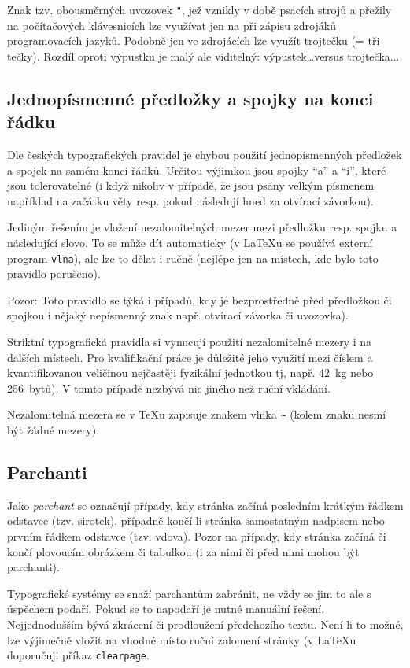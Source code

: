 Znak tzv. obousměrných uvozovek \verb!"!, jež vznikly v době psacích strojů a přežily na počítačových klávesnicích lze využívat jen na při zápisu zdrojáků programovacích jazyků. Podobně jen ve zdrojácích lze využít trojtečku (= tři tečky). Rozdíl oproti výpustku je malý ale viditelný: 
výpustek\ldots versus trojtečka...


\subsection{Jednopísmenné předložky a spojky na konci řádku}

Dle českých typografických pravidel je chybou použití jednopísmenných předložek a spojek na samém konci řádků. 
Určitou výjimkou jsou spojky \enquote{a} a \enquote{i}, které jsou tolerovatelné (i když nikoliv v případě, že jsou psány velkým písmenem například na začátku věty resp. pokud následují hned za otvírací závorkou).

Jediným řešením je vložení nezalomitelných mezer mezi předložku resp. spojku a následující slovo. To se může dít automaticky (v \LaTeX u se používá externí program \texttt{vlna}), ale lze to dělat i ručně (nejlépe jen  na místech, kde bylo toto pravidlo porušeno).

Pozor: Toto pravidlo se týká i případů, kdy je bezprostředně před předložkou či spojkou i nějaký nepísmenný znak např. otvírací závorka či uvozovka).

Striktní typografická pravidla si vynucují použití nezalomitelné mezery i na dalších místech. Pro kvalifikační práce je důležité jeho využití mezi číslem a kvantifikovanou veličinou nejčastěji fyzikální jednotkou tj, např. 42~kg nebo 256~bytů). V tomto případě nezbývá nic jiného než ruční vkládání.

Nezalomitelná mezera se v \TeX{}u zapisuje znakem vlnka \texttt{\textasciitilde} (kolem znaku nesmí být žádné mezery).

\subsection{Parchanti}

Jako \textit{parchant} se označují případy, kdy stránka začíná posledním krátkým řádkem odstavce (tzv. sirotek), případně končí-li stránka samostatným nadpisem nebo prvním řádkem odstavce (tzv. vdova). Pozor na případy, kdy stránka začíná či končí plovoucím obrázkem či tabulkou (i za nimi či před nimi mohou být parchanti).

Typografické systémy se snaží parchantům zabránit, ne vždy se jim to ale s úspěchem podaří. Pokud se to napodaří je nutné manuální řešení. Nejjednodušším bývá zkrácení či prodloužení předchozího textu. Není-li to možné, lze výjimečně vložit na vhodné místo ruční zalomení stránky (v \LaTeX{}u doporučuji příkaz \verb!clearpage!.

